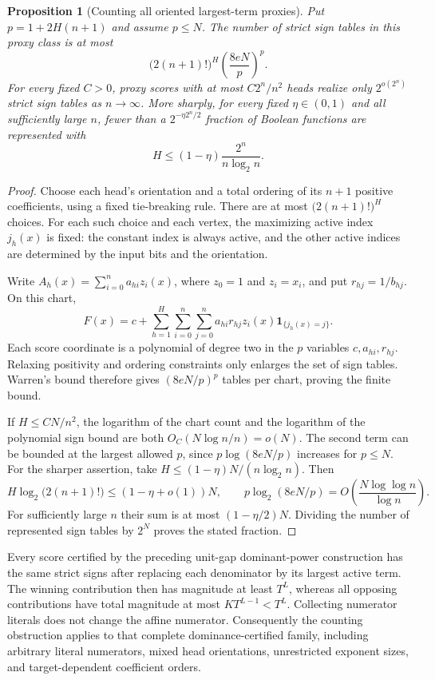 \documentclass[11pt]{article}
\newtheorem{proposition}{Proposition}
\begin{document}
\begin{proposition}[Counting all oriented largest-term proxies]
Put $p=1+2H(n+1)$ and assume $p\le N$. The number of strict sign
tables in this proxy class is at most
\[
 \bigl(2(n+1)!\bigr)^H
 \left(\frac{8eN}{p}\right)^p.
\]
For every fixed $C>0$, proxy scores with at most $C2^n/n^2$ heads
realize only $2^{o(2^n)}$ strict sign tables as $n\to\infty$.
More sharply, for every fixed $\eta\in(0,1)$ and all sufficiently
large $n$, fewer than a $2^{-\eta 2^n/2}$ fraction of Boolean
functions are represented with
\[
 H\le (1-\eta)\frac{2^n}{n\log_2 n}.
\]
\end{proposition}
\begin{proof}
Choose each head's orientation and a total ordering of its $n+1$
positive coefficients, using a fixed tie-breaking rule. There are
at most $\bigl(2(n+1)!\bigr)^H$ choices. For each such choice and
each vertex, the maximizing active index $j_h(x)$ is fixed: the
constant index is always active, and the other active indices are
determined by the input bits and the orientation.

Write $A_h(x)=\sum_{i=0}^n a_{hi}z_i(x)$, where $z_0=1$
and $z_i=x_i$, and put $r_{hj}=1/b_{hj}$. On this chart,
\[
 F(x)=c+\sum_{h=1}^H\sum_{i=0}^n\sum_{j=0}^n
      a_{hi}r_{hj}z_i(x)\mathbf1_{\{j_h(x)=j\}}.
\]
Each score coordinate is a polynomial of degree two in the $p$
variables $c,a_{hi},r_{hj}$. Relaxing positivity and ordering
constraints only enlarges the set of sign tables. Warren's bound
therefore gives $(8eN/p)^p$ tables per chart, proving the finite
bound.

If $H\le CN/n^2$, the logarithm of the chart count and the
logarithm of the polynomial sign bound are both
$O_C(N\log n/n)=o(N)$. The second term can be bounded at the
largest allowed $p$, since $p\log(8eN/p)$ increases for $p\le N$.
For the sharper assertion, take
$H\le(1-\eta)N/(n\log_2 n)$. Then
\[
 H\log_2\bigl(2(n+1)!\bigr)\le(1-\eta+o(1))N,
 \qquad
 p\log_2(8eN/p)=O\left(\frac{N\log\log n}{\log n}\right).
\]
For sufficiently large $n$ their sum is at most
$(1-\eta/2)N$. Dividing the number of represented sign tables
by $2^N$ proves the stated fraction.
\end{proof}

Every score certified by the preceding unit-gap dominant-power
construction has the same strict signs after replacing each
denominator by its largest active term. The winning contribution
then has magnitude at least $T^L$, whereas all opposing
contributions have total magnitude at most $KT^{L-1}<T^L$.
Collecting numerator literals does not change the affine numerator.
Consequently the counting obstruction applies to that complete
dominance-certified family, including arbitrary literal numerators,
mixed head orientations, unrestricted exponent sizes, and
target-dependent coefficient orders.
\end{document}
